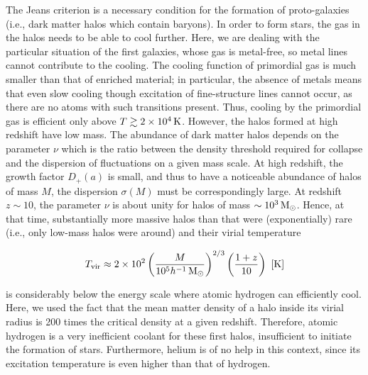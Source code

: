 \documentclass[a4paper,11pt]{article}
\begin{document}
{\noindent}The Jeans criterion is a necessary condition for the formation of proto-galaxies (i.e., dark matter halos which contain baryons). In order to form stars, the gas in the halos needs to be able to cool further. Here, we are dealing with the particular situation of the first galaxies, whose gas is metal-free, so metal lines cannot contribute to the cooling. The cooling function of primordial gas is much smaller than that of enriched material; in particular, the absence of metals means that even slow cooling though excitation of fine-structure lines cannot occur, as there are no atoms with such transitions present. Thus, cooling by the primordial gas is efficient only above $T\gtrsim2\times10^4\,{\rm K}$. However, the halos formed at high redshift have low mass. The abundance of dark matter halos depends on the parameter $\nu$ which is the ratio between the density threshold required for collapse and the dispersion of fluctuations on a given mass scale. At high redshift, the growth factor $D_+(a)$ is small, and thus to have a noticeable abundance of halos of mass $M$, the dispersion $\sigma(M)$ must be correspondingly large. At redshift $z\sim10$, the parameter $\nu$ is about unity for halos of mass $\sim10^3\,{\rm M_\odot}$. Hence, at that time, substantially more massive halos than that were (exponentially) rare (i.e., only low-mass halos were around) and their virial temperature

\begin{align*}
    T_\mathrm{vir} \approx 2\times10^2 \left(\frac{M}{10^5h^{-1}\,{\rm M_\odot}}\right)^{2/3} \left(\frac{1+z}{10}\right) ~ [{\rm K}]
\end{align*}

{\noindent}is considerably below the energy scale where atomic hydrogen can efficiently cool. Here, we used the fact that the mean matter density of a halo inside its virial radius is   200 times the critical density at a given redshift. Therefore, atomic hydrogen is a very inefficient coolant for these first halos, insufficient to initiate the formation of stars. Furthermore, helium is of no help in this context, since its excitation temperature is even higher than that of hydrogen.
\end{document}
